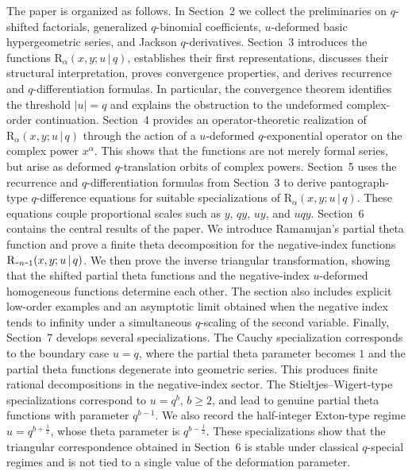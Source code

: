 \documentclass[12pt]{article}
\newcommand{\minus}{\textup{\texttt{-}}}
\newcommand{\rr}{\mathrm{R}}
\begin{document}
The paper is organized as follows. In Section~2 we collect the preliminaries on \(q\)-shifted factorials, generalized \(q\)-binomial coefficients, \(u\)-deformed basic hypergeometric series, and Jackson \(q\)-derivatives. Section~3 introduces the functions \(\rr_{\alpha}(x,y;u\,|\,q)\), establishes their first representations, discusses their structural interpretation, proves convergence properties, and derives recurrence and \(q\)-differentiation formulas. In particular, the convergence theorem identifies the threshold \(|u|=q\) and explains the obstruction to the undeformed complex-order continuation. Section~4 provides an operator-theoretic realization of \(\rr_{\alpha}(x,y;u\,|\,q)\) through the action of a \(u\)-deformed \(q\)-exponential operator on the complex power \(x^\alpha\). This shows that the functions are not merely formal series, but arise as deformed \(q\)-translation orbits of complex powers. Section~5 uses the recurrence and \(q\)-differentiation formulas from Section~3 to derive pantograph-type \(q\)-difference equations for suitable specializations of \(\rr_{\alpha}(x,y;u\,|\,q)\). These equations couple proportional scales such as \(y\), \(qy\), \(uy\), and \(uqy\). Section~6 contains the central results of the paper. We introduce Ramanujan's partial theta function and prove a finite theta decomposition for the negative-index functions \(\rr_{\minus n\minus1}(x,y;u\,|\,q)\). We then prove the inverse triangular transformation, showing that the shifted partial theta functions and the negative-index \(u\)-deformed homogeneous functions determine each other. The section also includes explicit low-order examples and an asymptotic limit obtained when the negative index tends to infinity under a simultaneous \(q\)-scaling of the second variable. Finally, Section~7 develops several specializations. The Cauchy specialization corresponds to the boundary case \(u=q\), where the partial theta parameter becomes \(1\) and the partial theta functions degenerate into geometric series. This produces finite rational decompositions in the negative-index sector. The Stieltjes--Wigert-type specializations correspond to \(u=q^b\), \(b\geq2\), and lead to genuine partial theta functions with parameter \(q^{b-1}\). We also record the half-integer Exton-type regime \(u=q^{b+\frac12}\), whose theta parameter is \(q^{b-\frac12}\). These specializations show that the triangular correspondence obtained in Section~6 is stable under classical \(q\)-special regimes and is not tied to a single value of the deformation parameter.
\end{document}
